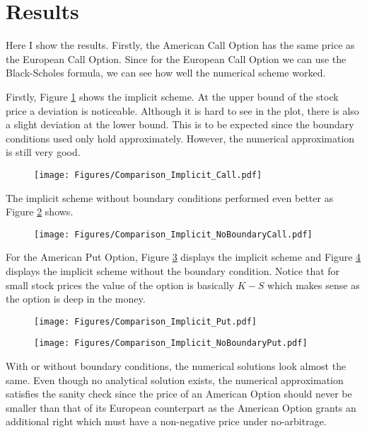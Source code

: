 \documentclass[11pt,a4paper]{article}
\begin{document}
\section{Results}
Here I show the results. Firstly, the American Call Option has the same price as the European Call Option. Since for the European Call Option we can use the Black-Scholes formula, we can see how well the numerical scheme worked. 

Firstly, Figure \ref{Fig:Comparison_Implicit_Call} shows the implicit scheme. At the upper bound of the stock price a deviation is noticeable. Although it is hard to see in the plot, there is also a slight deviation at the lower bound. This is to be expected since the boundary conditions used only hold approximately. However, the numerical approximation is still very good.
\begin{figure}[pb]
\centering
\caption{} \label{Fig:Comparison_Implicit_Call}
\texttt{[image: Figures/Comparison\_Implicit\_Call.pdf]}
\end{figure}

The implicit scheme without boundary conditions performed even better as Figure \ref{Fig:Comparison_Implicit_NoBoundaryCall} shows. 
\begin{figure}[htpb]
\centering
\caption{} \label{Fig:Comparison_Implicit_NoBoundaryCall}
\texttt{[image: Figures/Comparison\_Implicit\_NoBoundaryCall.pdf]}
\end{figure}

For the American Put Option, Figure \ref{Fig:Comparison_Implicit_Put} displays the implicit scheme and Figure \ref{Fig:Comparison_Implicit_NoBoundaryPut} displays the implicit scheme without the boundary condition. Notice that for small stock prices the value of the option is basically $K-S$ which makes sense as the option is deep in the money.
\begin{figure}[htpb]
\centering
\caption{} \label{Fig:Comparison_Implicit_Put}
\texttt{[image: Figures/Comparison\_Implicit\_Put.pdf]}
\end{figure}
\begin{figure}[htpb]
\centering
\caption{} \label{Fig:Comparison_Implicit_NoBoundaryPut}
\texttt{[image: Figures/Comparison\_Implicit\_NoBoundaryPut.pdf]}
\end{figure}

With or without boundary conditions, the numerical solutions look almost the same. Even though no analytical solution exists, the numerical approximation satisfies the sanity check since the price of an American Option should never be smaller than that of its European counterpart as the American Option grants an additional right which must have a non-negative price under no-arbitrage. 
\end{document}
